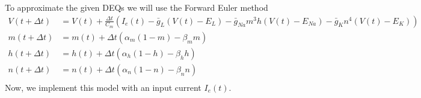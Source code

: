 \documentclass[12pt]{article}
\begin{document}
\begin{enumerate}
        To approximate the given DEQs we will use the Forward Euler method
        \begin{align*}
            V(t + \Delta t) &= V(t) + \frac{\Delta t}{C_{m}}\left(I_{e}(t) - \bar{g}_{L}\left(V(t)-E_{L}\right) - \bar{g}_{Na}m^{3}h\left(V(t)-E_{Na}\right) - \bar{g}_{K}n^{4}\left(V(t)-E_{K}\right)\right)\\
            m(t + \Delta t) &= m(t) + \Delta t\left(\alpha_{m}\left(1-m\right)-\beta_{m}m\right)\\
            h(t + \Delta t) &= h(t) + \Delta t\left(\alpha_{h}\left(1-h\right)-\beta_{h}h\right)\\
            n(t + \Delta t) &= n(t) + \Delta t\left(\alpha_{n}\left(1-n\right)-\beta_{n}n\right)\\
        \end{align*}
        Now, we implement this model with an input current $I_{e}(t)$.
    \end{enumerate}
\end{document}
